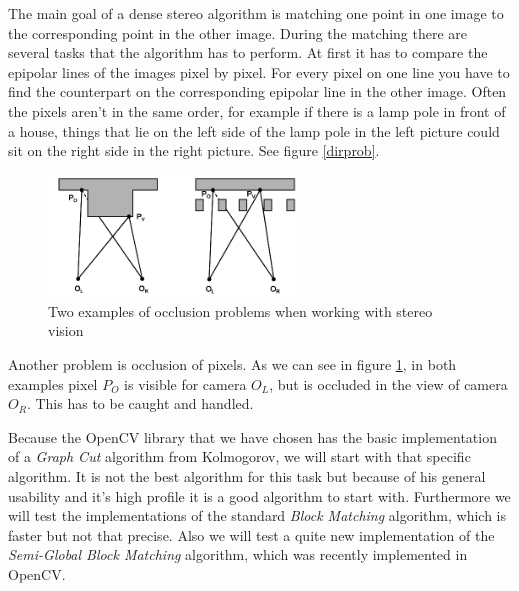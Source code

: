 \documentclass[a4paper]{article}
\begin{document}
The main goal of a dense stereo algorithm is matching one point in one
image to the corresponding point in the other image. During the
matching there are several tasks that the algorithm has to perform. At
first it has to compare the epipolar lines of the images pixel by
pixel. For every pixel on one line you have to find the counterpart on
the corresponding epipolar line in the other image. Often the pixels
aren't in the same order, for example if there is a lamp pole in front
of a house, things that lie on the left side of the lamp pole in the
left picture could sit on the right side in the right picture. See
figure \ref{dirprob}.

\begin{figure} [h!tb]
\centering
\includegraphics[width=0.6\textwidth]{matching_problems_occlusion}
\caption{Two examples of occlusion problems when working with stereo
vision}
\label{occprob} 
\end{figure}

Another problem is occlusion of pixels. As we can see in figure \ref{occprob},
in both examples pixel $P_O$ is visible for camera $O_L$, but is occluded in the
view of camera $O_R$. This has to be caught and handled. 

Because the OpenCV library that we have chosen has the basic
implementation of a \emph{Graph Cut} algorithm from
Kolmogorov\cite{kolmogorov2003}, we will start with that specific
algorithm. It is not the best algorithm for this task but because of
his general usability and it's high profile it is a good algorithm to start
with. Furthermore we will test the implementations of the
standard \emph{Block Matching} algorithm, which is faster but not that
precise. Also we will test a quite new implementation of the
\emph{Semi-Global Block Matching} algorithm, which was recently implemented in OpenCV.
\end{document}
